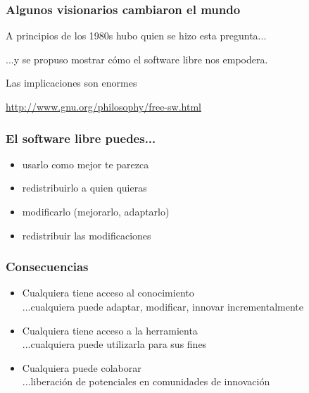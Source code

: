 \documentclass[17pt,aspectratio=169]{beamer}
\begin{document}
\begin{frame}
\frametitle{Algunos visionarios cambiaron el mundo}

A principios de los 1980s hubo quien se hizo esta pregunta...

\vspace{.1cm}

...y se propuso mostrar cómo el software libre nos empodera.

\vspace{.1cm}

Las implicaciones son enormes

\begin{flushright}
{\small \url{http://www.gnu.org/philosophy/free-sw.html}}
\end{flushright}
\end{frame}


\begin{frame}
\frametitle{El software libre puedes...}

{\large
\begin{itemize}
\item usarlo como mejor te parezca
\item redistribuirlo a quien quieras
\item modificarlo (mejorarlo, adaptarlo)
\item redistribuir las modificaciones
\end{itemize}
}
\end{frame}


\begin{frame}
\frametitle{Consecuencias}

\begin{itemize}
\item Cualquiera tiene acceso al conocimiento \\
  ...cualquiera puede adaptar, modificar, innovar incrementalmente
\item Cualquiera tiene acceso a la herramienta \\
  ...cualquiera puede utilizarla para sus fines
\item Cualquiera puede colaborar \\
  ...liberación de potenciales en comunidades de innovación
\end{itemize}

\end{frame}
\end{document}

